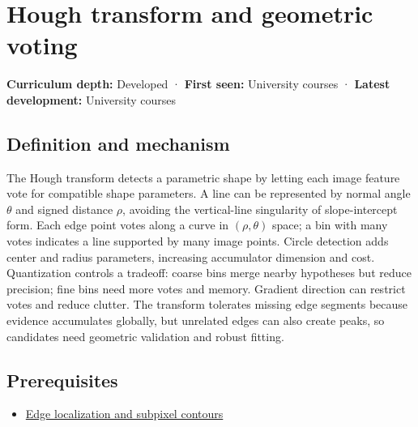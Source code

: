 \hypertarget{appendix-a5b0383b3b3e}{}\label{referencestart:appendix-a5b0383b3b3e}
\section{Hough transform and geometric voting}\label{appendix-a5b0383b3b3e-hough-transform-and-geometric-voting}

\hypertarget{appendix-a5b0383b3b3e-hough-transform-and-geometric-voting}{}

\textbf{Curriculum depth:} Developed · \textbf{First seen:} University courses · \textbf{Latest development:} University courses

\begin{allmightroledefinition}

\subsection{Definition and mechanism}\label{appendix-a5b0383b3b3e-definition-and-mechanism}

\hypertarget{appendix-a5b0383b3b3e-definition-and-mechanism}{}

The Hough transform detects a parametric shape by letting each image feature vote for compatible shape parameters. A line can be represented by normal angle \(\theta\) and signed distance \(\rho\), avoiding the vertical-line singularity of slope-intercept form. Each edge point votes along a curve in \((\rho,\theta)\) space; a bin with many votes indicates a line supported by many image points. Circle detection adds center and radius parameters, increasing accumulator dimension and cost. Quantization controls a tradeoff: coarse bins merge nearby hypotheses but reduce precision; fine bins need more votes and memory. Gradient direction can restrict votes and reduce clutter. The transform tolerates missing edge segments because evidence accumulates globally, but unrelated edges can also create peaks, so candidates need geometric validation and robust fitting.

\end{allmightroledefinition}

\subsection{Prerequisites}\label{appendix-a5b0383b3b3e-prerequisites}

\hypertarget{appendix-a5b0383b3b3e-prerequisites}{}

\begin{itemize}
\tightlist
\item
  \hyperref[appendix-36022286b03e]{Edge localization and subpixel contours}
\end{itemize}

